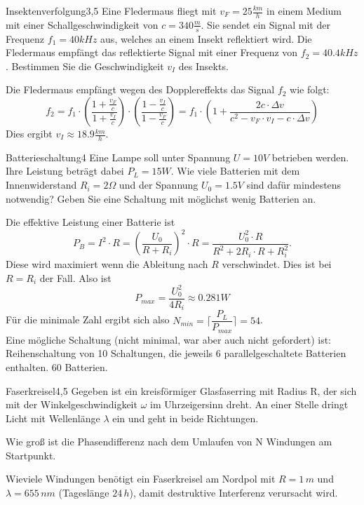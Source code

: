 

\begin{problem}{Insektenverfolgung}{3,5}
Eine Fledermaus fliegt mit $v_F=25\unit{\frac{km}{h}}$ in einem Medium mit einer Schallgeschwindigkeit von $c=340\unit{\frac{m}{s}}$.
Sie sendet ein Signal mit der Frequenz $f_1=40\unit{kHz}$ aus, welches an einem Insekt reflektiert wird. Die Fledermaus empfängt das reflektierte Signal mit einer Frequenz von $f_2=40.4\unit{kHz}$. Bestimmen Sie die Geschwindigkeit $v_I$ des Insekts.
\begin{solution}
Die Fledermaus empfängt wegen des Dopplereffekts das Signal $f_2$ wie folgt:
\[
f_2=f_1\cdot \left(\dfrac{1+\frac{v_F}{c}}{1+\frac{v_I}{c}}\right)\cdot \left(\dfrac{1-\frac{v_I}{c}}{1-\frac{v_F}{c}}\right)=f_1\cdot \left(1+\dfrac{2c\cdot \Delta v}{c^2-v_F\cdot v_I-c\cdot \Delta v}\right)
\]
Dies ergibt $v_I\approx 18.9\unit{\frac{km}{h}}$.
\end{solution}
\end{problem}

\begin{problem}{Batterieschaltung}{4}
Eine Lampe soll unter Spannung $U=10\unit{V}$ betrieben werden. Ihre Leistung beträgt dabei $P_L=15\unit{W}$.
Wie viele Batterien mit dem Innenwiderstand $R_i=2\unit{\Omega}$ und der Spannung $U_0=1.5\unit{V}$ sind dafür mindestens notwendig? Geben Sie eine Schaltung mit möglichst wenig Batterien an.
\begin{solution}
Die effektive Leistung einer Batterie ist
\[
P_B=I^2\cdot R=\left(\dfrac{U_0}{R+R_i}\right)^2\cdot R=\dfrac{U_0^2\cdot R}{R^2+2R_i\cdot R+R_i^2}.
\]
Diese wird maximiert wenn die Ableitung nach $R$ verschwindet. Dies ist bei $R=R_{i}$ der Fall.
Also ist
\[
P_{max}=\dfrac{U_0^2}{4R_i}\approx 0.281 \unit{W}
\]
Für die minimale Zahl ergibt sich also $N_{min}=\lceil\dfrac{P_L}{P_{max}}\rceil=54$.\\
Eine mögliche Schaltung (nicht minimal, war aber auch nicht gefordert) ist:
Reihenschaltung von 10 Schaltungen, die jeweils 6 parallelgeschaltete Batterien enthalten. 60 Batterien.
\end{solution}
\end{problem}

\begin{problem}{Faserkreisel}{4,5}
Gegeben ist ein kreisförmiger Glasfaserring mit Radius R, der sich mit der Winkelgeschwindigkeit $\omega$ im Uhrzeigersinn dreht.
An einer Stelle dringt Licht mit Wellenlänge $\lambda$ ein und geht in beide Richtungen.
\begin{abcenum}
\item Wie groß ist die Phasendifferenz nach dem Umlaufen von N Windungen am Startpunkt.
\item Wieviele Windungen benötigt ein Faserkreisel am Nordpol mit $R=1\,m$ und $\lambda= 655\,nm$ (Tageslänge $24\,h$), damit destruktive Interferenz verursacht wird.
\end{abcenum}
\end{problem}

